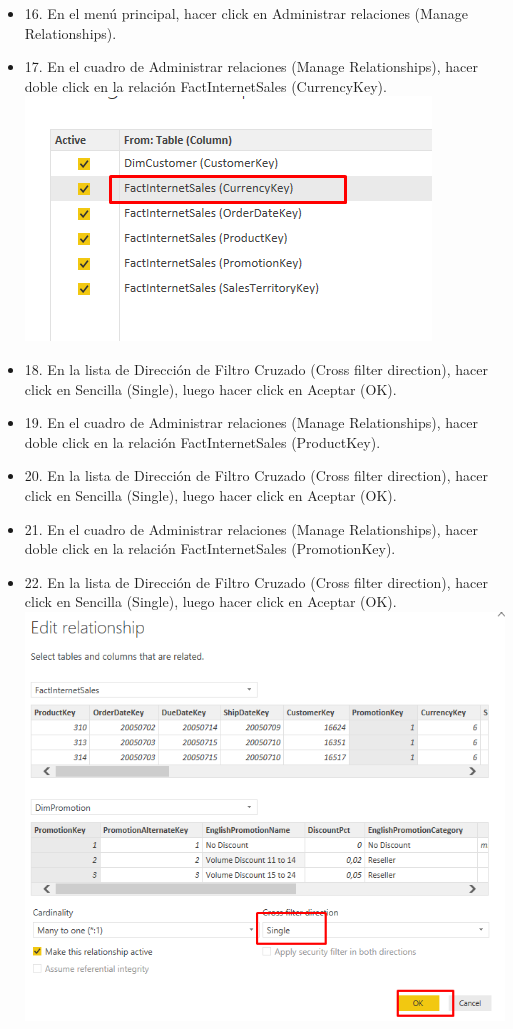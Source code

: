 \begin{itemize}
\item 16. En el menú principal, hacer click en Administrar relaciones (Manage Relationships).
\item 17. En el cuadro de Administrar relaciones (Manage Relationships), hacer doble click en la relación FactInternetSales (CurrencyKey). \\
\includegraphics[scale=0.5]{./Imagenes/image006}
\item 18. En la lista de Dirección de Filtro Cruzado (Cross filter direction), hacer click en Sencilla (Single), luego hacer click en Aceptar (OK).
\item 19. En el cuadro de Administrar relaciones (Manage Relationships), hacer doble click en la relación FactInternetSales (ProductKey).
\item 20. En la lista de Dirección de Filtro Cruzado (Cross filter direction), hacer click en Sencilla (Single), luego hacer click en Aceptar (OK).
\item 21. En el cuadro de Administrar relaciones (Manage Relationships), hacer doble click en la relación FactInternetSales (PromotionKey).
\item 22. En la lista de Dirección de Filtro Cruzado (Cross filter direction), hacer click en Sencilla (Single), luego hacer click en Aceptar (OK).\\
\includegraphics[scale=0.5]{./Imagenes/image007}

\end{itemize}
